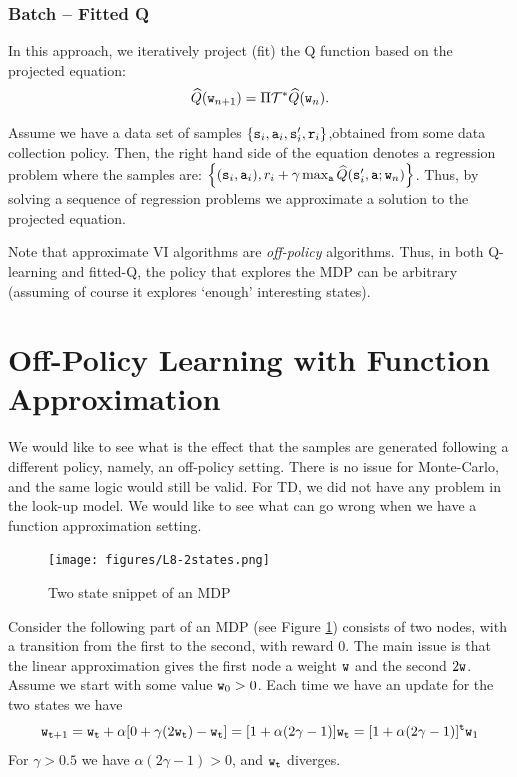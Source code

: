\subsubsection{Batch -- Fitted Q}

In this approach, we iteratively project (fit) the Q function based on the projected equation:
\begin{equation*}
    \widehat{Q}({\tt w}_{n+1}) = \Pi \mathcal{T}^* \widehat{Q}({\tt w}_{n}).
\end{equation*}

Assume we have a data set of samples $\{{\tt s}_i,{\tt a}_i,{\tt s}'_i,{\tt r}_i\}$,obtained from some data collection policy. Then, the right hand side of the equation denotes a regression problem where the samples are: $\left\{({\tt s}_i,{\tt a}_i), r_i + \gamma \max_{\tt a} \widehat{Q}({\tt s}'_i, {\tt a};{\tt w}_{n})\right\}$. Thus, by solving a sequence of regression problems we approximate a solution to the projected equation.

Note that approximate VI algorithms are \emph{off-policy} algorithms. Thus, in both Q-learning and fitted-Q, the policy that explores the MDP can be arbitrary (assuming of course it explores `enough' interesting states).

\section{Off-Policy Learning with Function Approximation}
\label{sec:off_policy_FA}

We would like to see what is the effect that the samples are generated
following a different policy, namely, an off-policy setting. There
is no issue for Monte-Carlo, and the same logic would still be
valid.  For TD, we did not have any problem in the look-up model. We
would like to see what can go wrong when we have a function
approximation setting.


\begin{figure}
  \begin{centering}
  \texttt{[image: figures/L8-2states.png]}\\
  \caption{Two state snippet of an MDP }\label{fig:L8-2state}
  \end{centering}
\end{figure}

Consider the following part of an MDP (see Figure
\ref{fig:L8-2state}) consists of two nodes, with a transition from
the first to the second, with reward $0$. The main issue is that the
linear approximation gives the first node a weight ${\tt w}$ and the
second $2{\tt w}$. Assume we start with some value ${\tt w}_0>0$.
Each time we have an update for the two states we have
\[
{\tt w}_{{\tt t}+1}={\tt w}_{\tt t} +\alpha[0+\gamma
(2{\tt w}_{\tt t})-{\tt w}_{\tt t}]=[1+\alpha(2\gamma-1)]{\tt w}_{\tt t}=[1+\alpha(2\gamma-1)]^{\tt t}{\tt w}_1
\]
For $\gamma>0.5$ we have $\alpha(2\gamma-1)>0$, and ${\tt w}_{\tt t}$
diverges.

